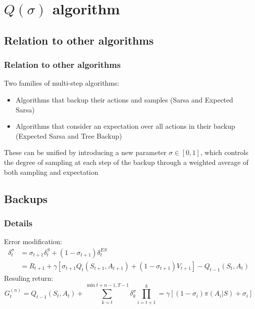 \documentclass{beamer}
\begin{document}
\section{$Q(\sigma)$ algorithm}

\subsection{Relation to other algorithms}

\begin{frame}
  \frametitle{Relation to other algorithms}
  Two families of multi-step algorithms:
  \begin{itemize}
    \item Algorithms that backup their actions and samples (Sarsa and
      Expected Sarsa)
    \item Algorithms that consider an expectation over all actions in their
      backup (Expected Sarsa and Tree Backup)
  \end{itemize}
  These can be unified by introducing a new parameter $\sigma \in [0, 1]$, which
  controls the degree of sampling at each step of the backup through a weighted
  average of both sampling and expectation
\end{frame}

\subsection{Backups}

\begin{frame}
  \frametitle{Details}
  Error modification:
  \begin{align*}
    \delta_t^{\sigma}
      &= \sigma_{t+1} \delta_{t}^S + (1 - \sigma_{t + 1}) \delta_t^{ES} \\
      &= R_{t + 1} + \gamma [\sigma_{t + 1} Q_t(S_{t + 1}, A_{t + 1}) +
                          (1 - \sigma_{t+ 1}) V_{t + 1}] - Q_{t - 1}(S_t, A_t)
  \end{align*}
  Resuling return:
  $$G_{t}^{(n)} = Q_{t - 1}(S_t, A_t) + \sum_{k = t}^{\min{t + n - 1, T- 1}}
    \delta_k^{\sigma} \prod_{i = t + 1}^{k} = \gamma
    [(1 - \sigma_i) \pi (A_i | S) + \sigma_i]$$
\end{frame}
\end{document}
